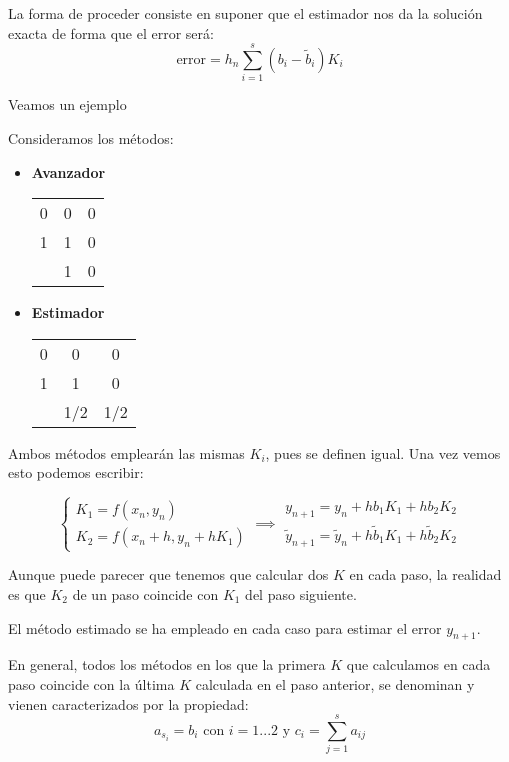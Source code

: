 La forma de proceder consiste en suponer que el estimador nos da la solución exacta de forma que el error será:
\[\text{error} = h_n \sum_{i=1}^s(b_i-\tilde{b}_i)K_i\]

Veamos un ejemplo
\begin{example}
Consideramos los métodos:
\begin{itemize}
\item \textbf{Avanzador}
\begin{center}
\begin{tabular}{c|cc}
0 & 0 & 0 \\
1 & 1 & 0\\
\hline
 & 1 & 0\\
\end{tabular}
\end{center}

\item \textbf{Estimador}

\begin{center}
\begin{tabular}{c|cc}
0 & 0 & 0 \\
1 & 1 & 0 \\
\hline
 & 1/2 & 1/2\\
\end{tabular}
\end{center}
\end{itemize}

Ambos métodos emplearán las mismas $K_i$, pues se definen igual. Una vez vemos esto podemos escribir:

\[\left\{ \begin{array}{l}
K_1=f(x_n,y_n)\\
K_2=f(x_n+h,y_n+hK_1)

\end{array} \implies  \begin{array}{l}
y_{n+1} = y_n+hb_1K_1+hb_2K_2\\
\tilde{y}_{n+1} = \tilde{y}_n + h\tilde{b}_1K_1 + h\tilde{b}_2K_2
\end{array}\right.\]

Aunque puede parecer que tenemos que calcular dos $K$ en cada paso, la realidad es que $K_2$ de un paso coincide con $K_1$ del paso siguiente.

El método estimado se ha empleado en cada caso para estimar el error $y_{n+1}$.
\end{example}

En general, todos los métodos en los que la primera $K$ que calculamos en cada paso coincide con la última $K$ calculada en el paso anterior, se denominan  y vienen caracterizados por la propiedad:
\[a_{s_i}=b_i \text{ con } i=1...2 \text{ y } c_i = \sum_{j=1}^sa_{ij}\]